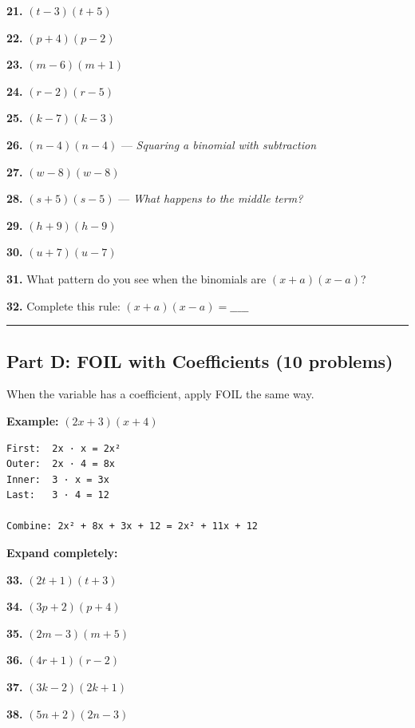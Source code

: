 \documentclass[
  11pt,
]{article}
\begin{document}
\textbf{21.} \((t - 3)(t + 5)\)

\textbf{22.} \((p + 4)(p - 2)\)

\textbf{23.} \((m - 6)(m + 1)\)

\textbf{24.} \((r - 2)(r - 5)\)

\textbf{25.} \((k - 7)(k - 3)\)

\textbf{26.} \((n - 4)(n - 4)\) --- \emph{Squaring a binomial with
subtraction}

\textbf{27.} \((w - 8)(w - 8)\)

\textbf{28.} \((s + 5)(s - 5)\) --- \emph{What happens to the middle
term?}

\textbf{29.} \((h + 9)(h - 9)\)

\textbf{30.} \((u + 7)(u - 7)\)

\textbf{31.} What pattern do you see when the binomials are
\((x + a)(x - a)\)?

\textbf{32.} Complete this rule: \((x + a)(x - a) = \_\_\_\_\_\)

\begin{center}\rule{0.5\linewidth}{0.5pt}\end{center}

\hypertarget{part-d-foil-with-coefficients-10-problems}{%
\subsection{Part D: FOIL with Coefficients (10
problems)}\label{part-d-foil-with-coefficients-10-problems}}

When the variable has a coefficient, apply FOIL the same way.

\textbf{Example:} \((2x + 3)(x + 4)\)

\begin{verbatim}
First:  2x · x = 2x²
Outer:  2x · 4 = 8x
Inner:  3 · x = 3x
Last:   3 · 4 = 12

Combine: 2x² + 8x + 3x + 12 = 2x² + 11x + 12
\end{verbatim}

\textbf{Expand completely:}

\textbf{33.} \((2t + 1)(t + 3)\)

\textbf{34.} \((3p + 2)(p + 4)\)

\textbf{35.} \((2m - 3)(m + 5)\)

\textbf{36.} \((4r + 1)(r - 2)\)

\textbf{37.} \((3k - 2)(2k + 1)\)

\textbf{38.} \((5n + 2)(2n - 3)\)
\end{document}
